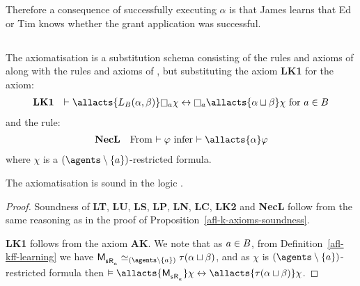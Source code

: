 \begin{example}
    Therefore a consequence of successfully executing $\alpha$ is that James learns that Ed or Tim knows whether the grant application was successful.
\end{example}

\subsection{\classKFF{}}

\begin{definition}\label{afl-kff-axioms}
    The axiomatisation \axiomAflKFF{} is a substitution schema consisting of the rules and axioms of \axiomKFF{} along with the rules and axioms of \axiomAflK{}, but substituting the \axiomAflK{} axiom {\bf LK1} for the axiom:
    $$
    \begin{array}{rl}
        {\bf LK1} & \proves \allacts{\learns_\agentsB (\alpha, \beta)} \necessary[\agentA] \chi \iff \necessary[\agentA] \allacts{\alpha \choice \beta} \chi \text{ for } \agentA \in \agentsB\\
    \end{array}
    $$
    and the rule:
    $$
    \begin{array}{rl}
        {\bf NecL} & \text{From $\proves \phi$ infer $\proves \allacts{\alpha} \phi$}
    \end{array}
    $$
    where $\chi$ is a $(\agents \setminus \{\agentA\})$-restricted formula.
\end{definition}

\begin{proposition}\label{afl-kff-axioms-soundness}
    The axiomatisation \axiomAflKFF{} is sound in the logic \logicAmlKFF{}.
\end{proposition}

\begin{proof}
    Soundness of {\bf LT}, {\bf LU}, {\bf LS}, {\bf LP}, {\bf LN}, {\bf LC}, {\bf LK2} and {\bf NecL} follow from the same reasoning as in the proof of Proposition~\ref{afl-k-axioms-soundness}.

    {\bf LK1} follows from the \axiomAmlKFF{} axiom {\bf AK}.
    We note that as $a \in B$, from Definition~\ref{afl-kff-learning} we have $\aPModel{\aStateS \aAccessibility{\agentA}} \bisimilar[(\agents \setminus \{\agentA\})] \tau(\alpha \choice \beta)$, and as $\chi$ is $(\agents \setminus \{\agentA\})$-restricted formula then $\entails \allacts{\aPModel{\aStateS \aAccessibility{\agentA}}} \chi \iff \allacts{\tau(\alpha \choice \beta)} \chi$.
\end{proof}

